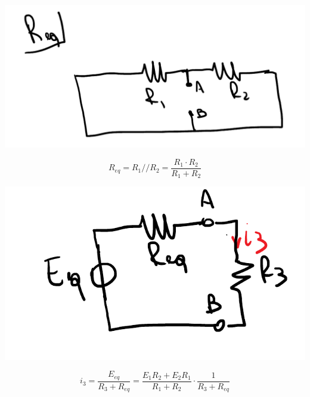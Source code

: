 \documentclass{article}
\begin{document}
\begin{center}
    \includegraphics[scale=0.28]{Image/Esempio_Thevenin_3.png}
\end{center}
\[
    R_{eq} = R_1 // R_2 = \frac{R_1 \cdot R_2}{R_1 + R_2}
\]
\begin{center}
    \includegraphics[scale=0.27]{Image/Esempio_Thevenin_4.png}
\end{center}
\[
    i_3 = \frac{E_{eq}}{R_3+R_{eq}} = \frac{E_1R_2+E_2R_1}{R_1+R_2} \cdot \frac{1}{R_3+R_{eq}}
\]
\end{document}
